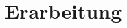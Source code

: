 \documentclass[index.tex]{subfiles}
\begin{document}
\makeatother
\chapter*{Erarbeitung}
\makeatother
\end{document}
